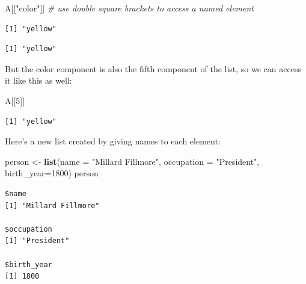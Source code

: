 \documentclass[
]{article}
\newenvironment{Shaded}{\begin{snugshade}}{\end{snugshade}}
\newcommand{\CommentTok}[1]{\textcolor[rgb]{0.56,0.35,0.01}{\textit{#1}}}
\newcommand{\DataTypeTok}[1]{\textcolor[rgb]{0.13,0.29,0.53}{#1}}
\newcommand{\DecValTok}[1]{\textcolor[rgb]{0.00,0.00,0.81}{#1}}
\newcommand{\KeywordTok}[1]{\textcolor[rgb]{0.13,0.29,0.53}{\textbf{#1}}}
\newcommand{\NormalTok}[1]{#1}
\newcommand{\OperatorTok}[1]{\textcolor[rgb]{0.81,0.36,0.00}{\textbf{#1}}}
\newcommand{\StringTok}[1]{\textcolor[rgb]{0.31,0.60,0.02}{#1}}
\begin{document}
\begin{Shaded}
\begin{Highlighting}[]
\NormalTok{A[[}\StringTok{"color"}\NormalTok{]]  }\CommentTok{# use double square brackets to access a named element}
\end{Highlighting}
\end{Shaded}

\begin{verbatim}
[1] "yellow"
\end{verbatim}

\begin{Shaded}
\end{Shaded}

\begin{verbatim}
[1] "yellow"
\end{verbatim}

But the color component is also the fifth component of the list, so we can access it like this as well:

\begin{Shaded}
\begin{Highlighting}[]
\NormalTok{A[[}\DecValTok{5}\NormalTok{]]}
\end{Highlighting}
\end{Shaded}

\begin{verbatim}
[1] "yellow"
\end{verbatim}

Here's a new list created by giving names to each element:

\begin{Shaded}
\begin{Highlighting}[]
\NormalTok{person <-}\StringTok{ }\KeywordTok{list}\NormalTok{(}\DataTypeTok{name =} \StringTok{"Millard Fillmore"}\NormalTok{, }\DataTypeTok{occupation =} \StringTok{"President"}\NormalTok{, }\DataTypeTok{birth_year=}\DecValTok{1800}\NormalTok{)}
\NormalTok{person}
\end{Highlighting}
\end{Shaded}

\begin{verbatim}
$name
[1] "Millard Fillmore"

$occupation
[1] "President"

$birth_year
[1] 1800
\end{verbatim}
\end{document}

